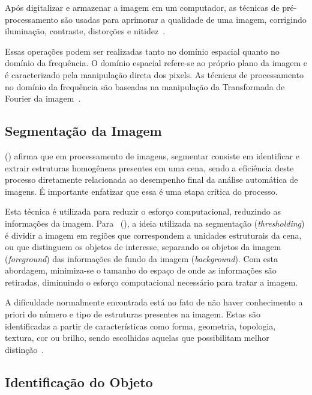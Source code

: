 Após digitalizar e armazenar a imagem em um computador, as técnicas de pré-processamento são usadas para aprimorar a qualidade de uma imagem, corrigindo iluminação, contraste, distorções e nitidez~\cite{rudek2001visao}.

Essas operações podem ser realizadas tanto no domínio espacial quanto no domínio da frequência. O domínio espacial refere-se ao próprio plano da imagem e é caracterizado pela manipulação direta dos pixels. As técnicas de processamento no domínio da frequência são baseadas na manipulação da Transformada de Fourier da imagem~\cite{rogeralex1999}.

\subsection{Segmentação da Imagem}
\label{subsec:segImagem}

\citeauthor{heinen2004navegaccao} (\citeyear{heinen2004navegaccao}) afirma que em processamento de imagens, segmentar consiste em identificar e extrair estruturas homogêneas presentes em uma cena, sendo a eficiência deste processo diretamente relacionada ao desempenho final da análise automática de imagens. É importante enfatizar que essa é uma etapa crítica do processo.

Esta técnica é utilizada para reduzir o esforço computacional, reduzindo as informações da imagem. Para~\citeauthor{rudek2001visao} (\citeyear{rudek2001visao}), a ideia utilizada na segmentação (\textit{thresholding}) é dividir a imagem em regiões que correspondem a unidades estruturais da cena, ou que distinguem os objetos de interesse, separando os objetos da imagem (\textit{foreground}) das informações de fundo da imagem (\textit{background}). Com esta abordagem, minimiza-se o tamanho do espaço de onde as informações são retiradas, diminuindo o esforço computacional necessário para tratar a imagem.

A dificuldade normalmente encontrada está no fato de não haver conhecimento a priori do número e tipo de estruturas presentes na imagem. Estas são identificadas a partir de características como forma, geometria, topologia, textura, cor ou brilho, sendo escolhidas aquelas que possibilitam melhor distinção~\cite{heinen2004navegaccao}.

\subsection{Identificação do Objeto}
\label{subsec:idObjeto}

